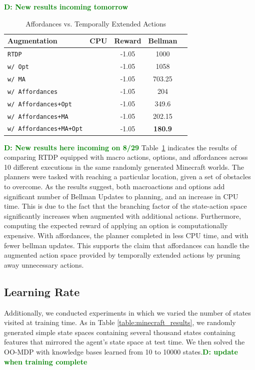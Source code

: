 \documentclass[conference]{IEEEtran}
\newcommand{\dnote}[1]{\textcolor{Green}{\textbf{D: #1}}}
\begin{document}
\dnote{New results incoming tomorrow}
\begin{table}[H]
\centering
\caption{Affordances vs. Temporally Extended Actions}
\begin{tabular}{ l  || c c c c}
  Augmentation 					&	CPU	&	Reward 	& Bellman \\ \hline
  \texttt{RTDP}  					&		&	-1.05		&	1000		\\
  \texttt{w/ Opt}  				&		&	-1.05		&	1058		\\
  \texttt{w/ MA}  					&		&	-1.05		&	703.25		\\
  \texttt{w/ Affordances}  			& 		&	-1.05		&	204		\\
  \texttt{w/ Affordances+Opt}  		& 		&	-1.05		&	349.6		\\
   \texttt{w/ Affordances+MA}  		& 		&	-1.05		&	202.15		\\
   \texttt{w/ Affordances+MA+Opt}  	& 		&	-1.05		&	{\bf 180.9}		\\
\end{tabular}
\label{table:temp_ext_act_results}
\end{table}

\dnote{New results here incoming on 8/29}
Table~\ref{table:temp_ext_act_results} indicates the results of comparing RTDP
equipped with macro actions, options, and affordances across 10 different executions
in the same randomly generated Minecraft worlds. The planners were tasked with 
reaching a particular location, given a set of obstacles to overcome. As the results 
suggest, both macroactions and options add significant number of Bellman Updates to 
planning, and an increase in CPU time. This is due to the fact that the branching factor of the state-action space significantly increases when augmented with additional actions. Furthermore, computing the expected reward of applying an option is computationally expensive. With affordances, the planner completed in less CPU time, and with fewer 
bellman updates. This supports the claim that affordances can handle the augmented 
action space provided by temporally extended actions by pruning away unnecessary actions.

\subsection{Learning Rate}
Additionally, we conducted experiments in which we varied the number of states visited at training time. 
As in Table \ref{table:minecraft_results}, we randomly generated simple state spaces
containing several thousand states containing features that mirrored the agent's state
space at test time. We then solved the OO-MDP with knowledge bases learned from 
10 to 10000 states.\dnote{update when training complete}
\end{document}
